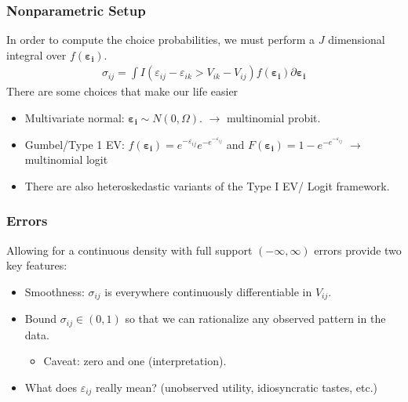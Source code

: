 \documentclass[aspectratio=169,11pt]{beamer}
\begin{document}
\begin{frame}
\frametitle{Nonparametric Setup}
In order to compute the choice probabilities, we must perform a $J$ dimensional integral over $f(\symbf{\varepsilon_i})$.
\begin{align*}
\sigma_{ij} =  \int I( \varepsilon_{ij}-\varepsilon_{ik} > V_{ik} - V_{ij} ) f(\symbf{\varepsilon_i}) \partial \symbf{\varepsilon_i}
\end{align*}
There are some choices that make our life easier
\begin{itemize}
\item Multivariate normal: $\symbf{\varepsilon_i} \sim N(0,\Omega)$. $\longrightarrow$ \alert{ multinomial probit}.
\item Gumbel/Type 1 EV: $f(\symbf{\varepsilon_i}) = e^{-\varepsilon_{ij}}  e^{-e^{-\varepsilon_{ij}}}  $ and $F(\symbf{\varepsilon_i}) = 1- e^{-e^{-\varepsilon_{ij}}}$ $\longrightarrow$ \alert{multinomial logit}
\item There are also heteroskedastic variants of the Type I EV/ Logit framework.
\end{itemize}
\end{frame}

\begin{frame}
\frametitle{Errors}
Allowing for a continuous density with full support $(-\infty, \infty)$ errors provide two key features:
\begin{itemize}
\item Smoothness: $\sigma_{ij}$ is everywhere continuously differentiable in $V_{ij}$.
\item Bound $\sigma_{ij} \in (0,1)$ so that we can rationalize any observed pattern in the data.
\begin{itemize}
\item Caveat: zero and one (interpretation).
\end{itemize}
\item What does $\varepsilon_{ij}$ really mean? (unobserved utility, idiosyncratic tastes, etc.)
\end{itemize}
\end{frame}
\end{document}
